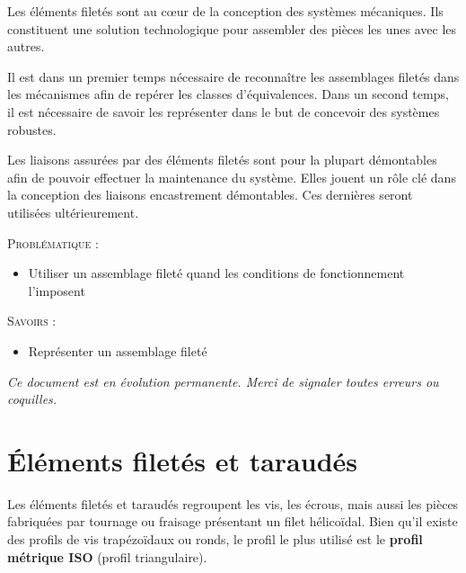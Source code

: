 \documentclass[11pt,oneside]{article}
\begin{document}
Les éléments filetés sont au c\oe{}ur de la conception des systèmes mécaniques. Ils constituent une solution technologique pour assembler des pièces les unes avec les autres. 

Il est dans un premier temps nécessaire de reconnaître les assemblages filetés dans les mécanismes afin de repérer les classes d'équivalences. Dans un second temps, il est nécessaire de savoir les représenter dans le but de concevoir des systèmes robustes.

Les liaisons assurées par des éléments filetés sont pour la plupart démontables afin de pouvoir effectuer la maintenance du système. Elles jouent un rôle clé dans la conception des liaisons encastrement démontables. Ces dernières seront utilisées ultérieurement.




\begin{prob}
\textsc{Problématique :}
\begin{itemize}
\item Utiliser un assemblage fileté quand les conditions de fonctionnement l'imposent
\end{itemize}
\end{prob}

\begin{savoir}
\textsc{Savoirs :}
\begin{itemize}
\item Représenter un assemblage fileté
\end{itemize}
\end{savoir}


\setlength{\parskip}{0ex plus 0.2ex minus 0ex}
 \renewcommand{\contentsname}{}
 \renewcommand{\baselinestretch}{1}

\tableofcontents

 \renewcommand{\baselinestretch}{1.2}
\setlength{\parskip}{2ex plus 0.5ex minus 0.2ex}

\textit{Ce document est en évolution permanente. Merci de signaler toutes
erreurs ou coquilles.}




\section{Éléments filetés et taraudés}
Les éléments filetés et taraudés regroupent les vis, les écrous, mais aussi les pièces fabriquées par tournage ou fraisage présentant un filet hélicoïdal. Bien qu'il existe des profils de vis trapézoïdaux ou ronds, le profil le plus utilisé est le \textbf{profil métrique ISO} (profil triangulaire).
\end{document}
